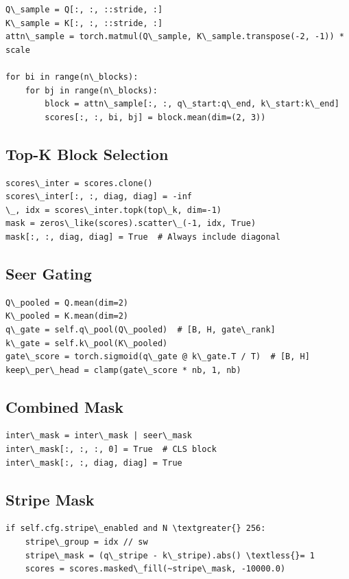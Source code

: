 \begin{lstlisting}
Q\_sample = Q[:, :, ::stride, :]
K\_sample = K[:, :, ::stride, :]
attn\_sample = torch.matmul(Q\_sample, K\_sample.transpose(-2, -1)) * scale

for bi in range(n\_blocks):
    for bj in range(n\_blocks):
        block = attn\_sample[:, :, q\_start:q\_end, k\_start:k\_end]
        scores[:, :, bi, bj] = block.mean(dim=(2, 3))
\end{lstlisting}

\subsection{Top-K Block Selection}

\begin{lstlisting}
scores\_inter = scores.clone()
scores\_inter[:, :, diag, diag] = -inf
\_, idx = scores\_inter.topk(top\_k, dim=-1)
mask = zeros\_like(scores).scatter\_(-1, idx, True)
mask[:, :, diag, diag] = True  # Always include diagonal
\end{lstlisting}

\subsection{Seer Gating}

\begin{lstlisting}
Q\_pooled = Q.mean(dim=2)
K\_pooled = K.mean(dim=2)
q\_gate = self.q\_pool(Q\_pooled)  # [B, H, gate\_rank]
k\_gate = self.k\_pool(K\_pooled)
gate\_score = torch.sigmoid(q\_gate @ k\_gate.T / T)  # [B, H]
keep\_per\_head = clamp(gate\_score * nb, 1, nb)
\end{lstlisting}

\subsection{Combined Mask}

\begin{lstlisting}
inter\_mask = inter\_mask | seer\_mask
inter\_mask[:, :, :, 0] = True  # CLS block
inter\_mask[:, :, diag, diag] = True
\end{lstlisting}

\subsection{Stripe Mask}

\begin{lstlisting}
if self.cfg.stripe\_enabled and N \textgreater{} 256:
    stripe\_group = idx // sw
    stripe\_mask = (q\_stripe - k\_stripe).abs() \textless{}= 1
    scores = scores.masked\_fill(~stripe\_mask, -10000.0)
\end{lstlisting}

